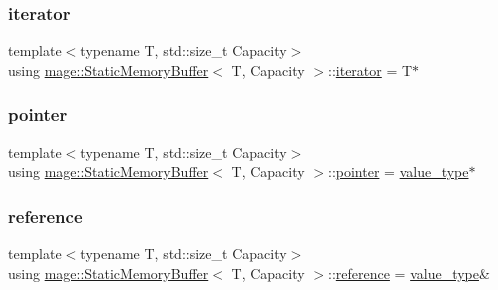 \mbox{\label{classmage_1_1_static_memory_buffer_abeee1c933cd54117e1a92de4a1cc698f}} 
\subsubsection{\texorpdfstring{iterator}{iterator}}
{\footnotesize\ttfamily template$<$typename T, std\+::size\+\_\+t Capacity$>$ \\
using \mbox{\hyperlink{classmage_1_1_static_memory_buffer}{mage\+::\+Static\+Memory\+Buffer}}$<$ T, Capacity $>$\+::\mbox{\hyperlink{classmage_1_1_static_memory_buffer_abeee1c933cd54117e1a92de4a1cc698f}{iterator}} =  T$\ast$}

\mbox{\label{classmage_1_1_static_memory_buffer_a490e41a142c436086990f978d3c98c02}} 
\subsubsection{\texorpdfstring{pointer}{pointer}}
{\footnotesize\ttfamily template$<$typename T, std\+::size\+\_\+t Capacity$>$ \\
using \mbox{\hyperlink{classmage_1_1_static_memory_buffer}{mage\+::\+Static\+Memory\+Buffer}}$<$ T, Capacity $>$\+::\mbox{\hyperlink{classmage_1_1_static_memory_buffer_a490e41a142c436086990f978d3c98c02}{pointer}} =  \mbox{\hyperlink{classmage_1_1_static_memory_buffer_a30a2fd97f8f458d752581dd69e717a97}{value\+\_\+type}}$\ast$}

\mbox{\label{classmage_1_1_static_memory_buffer_ac00b0718b8b57bcaee2a7904637fc031}} 
\subsubsection{\texorpdfstring{reference}{reference}}
{\footnotesize\ttfamily template$<$typename T, std\+::size\+\_\+t Capacity$>$ \\
using \mbox{\hyperlink{classmage_1_1_static_memory_buffer}{mage\+::\+Static\+Memory\+Buffer}}$<$ T, Capacity $>$\+::\mbox{\hyperlink{classmage_1_1_static_memory_buffer_ac00b0718b8b57bcaee2a7904637fc031}{reference}} =  \mbox{\hyperlink{classmage_1_1_static_memory_buffer_a30a2fd97f8f458d752581dd69e717a97}{value\+\_\+type}}\&}

